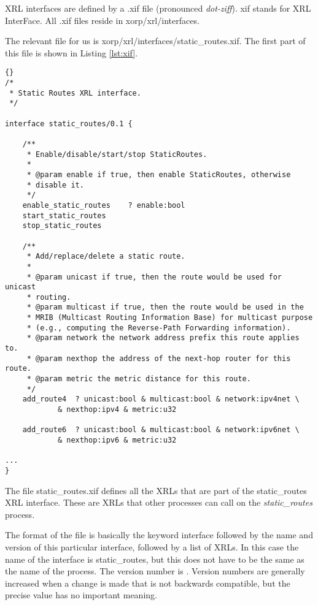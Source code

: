 \documentclass[11pt]{article}
\begin{document}
XRL interfaces are defined by a {\stt.xif} file (pronounced {\it dot-ziff}).
{\stt xif} stands for XRL InterFace.  All {\stt.xif} files reside in
{\stt xorp/xrl/interfaces}.

The relevant file for us is {\stt
xorp/xrl/interfaces/static\_routes.xif}. The first part of this file is
shown in Listing \ref{lst:xif}.

\begin{lstlisting}[caption={ The start of {\stt xorp/xrl/interfaces/static\_routes.xif} %
                                     \label{lst:xif} } ]{}
/*
 * Static Routes XRL interface.
 */

interface static_routes/0.1 {

	/**
	 * Enable/disable/start/stop StaticRoutes.
	 *
	 * @param enable if true, then enable StaticRoutes, otherwise
	 * disable it.
	 */
	enable_static_routes	? enable:bool
	start_static_routes
	stop_static_routes

	/**
	 * Add/replace/delete a static route.
	 *
	 * @param unicast if true, then the route would be used for unicast
	 * routing.
	 * @param multicast if true, then the route would be used in the
	 * MRIB (Multicast Routing Information Base) for multicast purpose
	 * (e.g., computing the Reverse-Path Forwarding information).
	 * @param network the network address prefix this route applies to.
	 * @param nexthop the address of the next-hop router for this route.
	 * @param metric the metric distance for this route.
	 */
	add_route4	? unicast:bool & multicast:bool & network:ipv4net \
			& nexthop:ipv4 & metric:u32

	add_route6	? unicast:bool & multicast:bool & network:ipv6net \
			& nexthop:ipv6 & metric:u32

...
}
\end{lstlisting}

The file {\stt static\_routes.xif} defines all the XRLs that are part of the
{\stt static\_routes} XRL interface.  These are XRLs that other processes can
call on the {\it static\_routes} process.

The format of the file is basically the keyword {\stt interface}
followed by the name and version of this particular interface,
followed by a list of XRLs.  
In this case the name of the interface is {\stt static\_routes}, but
this does not have to be the same as the name of the process.  The
version number is {\stt 0.1}.  Version numbers are generally increased
when a change is made that is not backwards compatible, but the
precise value has no important meaning.
\end{document}
